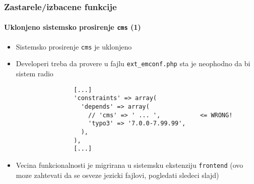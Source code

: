 \begin{frame}[fragile]
	\frametitle{Zastarele/izbacene funkcije}
	\framesubtitle{Uklonjeno sistemsko prosirenje \texttt{cms} (1)}

	\lstset{basicstyle=\tiny\ttfamily}

	\begin{itemize}

		\item Sistemsko prosirenje \texttt{cms} je uklonjeno

		\item Developeri treba da provere u fajlu \texttt{ext\_emconf.php} sta je neophodno da bi sistem radio

			\begin{lstlisting}
				[...]
				'constraints' => array(
				  'depends' => array(
				    // 'cms' => ' ... ',           <= WRONG!
				    'typo3' => '7.0.0-7.99.99',
				  ),
				),
				[...]
			\end{lstlisting}

		\item Vecina funkcionalnosti je migrirana u sistemsku ekstenziju \texttt{frontend}
			(ovo moze zahtevati da se osveze jezicki fajlovi, pogledati sledeci slajd)

	\end{itemize}

\end{frame}



